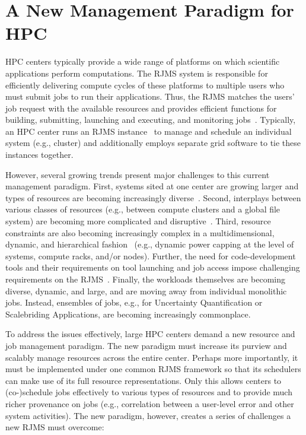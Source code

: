 \section{A New Management Paradigm for HPC}
\label{label:paradigm}
HPC centers typically provide a wide range of 
platforms on which scientific applications perform
computations.
The RJMS system is responsible for efficiently delivering 
compute cycles of these platforms
to multiple users who must submit jobs to run their applications. 
Thus, the RJMS matches the users' job request with the available 
resources and provides efficient functions 
for building, submitting, launching and executing, 
and monitoring jobs~\cite{GeorgiouThesis}. 
Typically, an HPC center runs an RJMS instance~\cite{Jette02slurm} 
to manage and schedule an individual system (e.g., cluster) and 
additionally employs separate grid software to tie 
these instances together. 

However, several growing trends present major challenges 
to this current management paradigm. 
First, systems sited at one center are growing larger 
and types of resources are becoming increasingly diverse~\cite{GeorgiouThesis}. 
Second, interplays between 
various classes of resources
(e.g., between compute clusters and a global file system)
are becoming more complicated and disruptive~\cite{SCR,SPINDLE}. 
Third, resource constraints are also becoming increasingly
complex in a multidimensional, dynamic, and hierarchical fashion~\cite{power-overprovision}
(e.g., dynamic power capping at the level of systems, compute racks, and/or nodes).
Further, the need for code-development tools and their requirements on tool launching and job access
impose challenging requirements on the RJMS~\cite{STAT,SPINDLE,PRUNER,SCR,launchmon}.
Finally, the workloads themselves are becoming 
diverse, dynamic, and large, and are moving away from individual monolithic jobs. Instead,
ensembles of jobs, e.g., for Uncertainty Quantification 
or Scalebriding Applications, are becoming increasingly commonplace.

To address the issues effectively,
large HPC centers demand a new resource and job management paradigm.
The new paradigm must increase its purview and 
scalably manage resources across the entire center.
Perhaps more importantly, it must be implemented under one common 
RJMS framework so that its schedulers can make use of
its full resource representations.
Only this allows centers to (co-)schedule jobs 
effectively to various types of resources and to
provide much richer provenance on jobs (e.g., correlation between
a user-level error and other system activities). 
The new paradigm, however,
creates a series of challenges a new RJMS must overcome:

